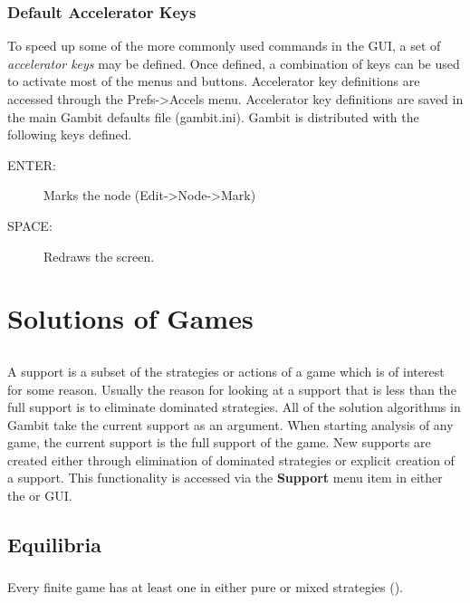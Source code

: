 \documentclass[12pt]{report}
\begin{document}
\subsection{Default Accelerator Keys}\label{ExtFormDefAccl}
To speed up some of the more commonly used commands in the GUI, a set of
{\em accelerator keys} may be defined.  Once defined, a combination of keys
can be used to activate most of the menus and buttons.  Accelerator key
definitions are accessed through the Prefs->Accels menu.  Accelerator key
definitions are saved in the main Gambit defaults file (gambit.ini).  Gambit
is distributed with the following keys defined.
\begin{description}
\item[ENTER:] Marks the node (Edit->Node->Mark)
\item[SPACE:] Redraws the screen.  
\end{description}

\chapter{Solutions of Games}

\section{}\label{supportsec}

A support is a subset of the strategies or actions of a game which is
of interest for some reason.  Usually the reason for looking at a
support that is less than the full support is to eliminate dominated
strategies.  All of the solution algorithms in Gambit take the current
support as an argument.  When starting analysis of any game, the
current support is the full support of the game.  New supports are
created either through elimination of dominated strategies or explicit
creation of a support.  This functionality is accessed via the {\bf
Support} menu item in either the  or
 GUI.

\section{Equilibria}

\subsection{}\label{nashsec}
Every finite game has at least one  in either pure or mixed strategies
(\cite{Nash:1950}).
\end{document}
